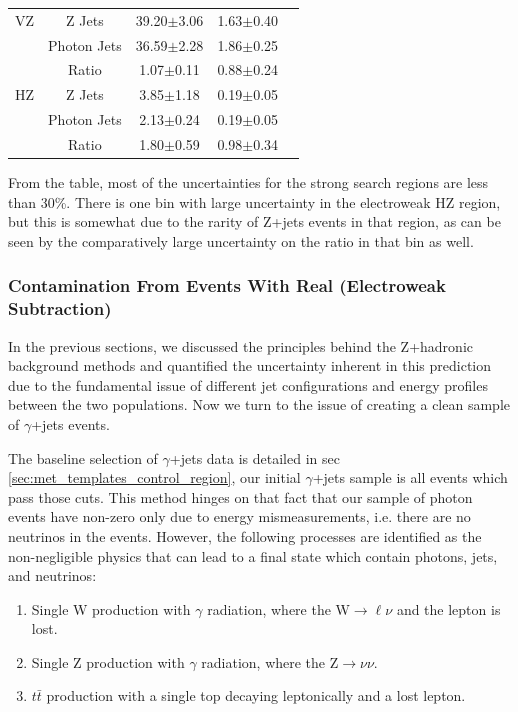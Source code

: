 \begin{table}[!h]
\begin{center}
\begin{tabular}{c|c|ccc}
            VZ & Z Jets & 39.20$\pm$3.06 & 1.63$\pm$0.40\\
            & Photon Jets   & 36.59$\pm$2.28 & 1.86$\pm$0.25\\
            & Ratio         & 1.07$\pm$0.11 & 0.88$\pm$0.24\\
            \hline

            HZ & Z Jets & 3.85$\pm$1.18 & 0.19$\pm$0.05\\
            & Photon Jets   & 2.13$\pm$0.24 & 0.19$\pm$0.05\\
            & Ratio         & 1.80$\pm$0.59 & 0.98$\pm$0.34\\
            \hline
          \end{tabular}
        \end{center}
      \end{table} 

      \clearpage

      From the table, most of the uncertainties for the strong search regions are less than 30\%. There is one bin with large uncertainty in the electroweak HZ region, but this is somewhat due to the rarity of Z+jets events in that region, as can be seen by the comparatively large uncertainty on the ratio in that bin as well.
    
    \subsubsection{Contamination From Events With Real \MET (Electroweak Subtraction)} \label{sec:ewk_subtraction}
      In the previous sections, we discussed the principles behind the Z+hadronic background methods and quantified the uncertainty inherent in this prediction due to the fundamental issue of different jet configurations and energy profiles between the two populations. Now we turn to the issue of creating a clean sample of $\gamma$+jets events. 

      The baseline selection of $\gamma$+jets data is detailed in sec \ref{sec:met_templates_control_region}, our initial $\gamma$+jets sample is all events which pass those cuts. This method hinges on that fact that our sample of photon events have non-zero \MET only due to energy mismeasurements, i.e. there are no neutrinos in the events. However, the following processes are identified as the non-negligible physics that can lead to a final state which contain photons, jets, and neutrinos:

      \begin{enumerate}
        \item Single W production with $\gamma$ radiation, where the W$\to \ell \nu$ and the lepton is lost. 
        \item Single Z production with $\gamma$ radiation, where the Z$\to \nu \nu$.
        \item $t\bar{t}$ production with a single top decaying leptonically and a lost lepton.
      \end{enumerate}


